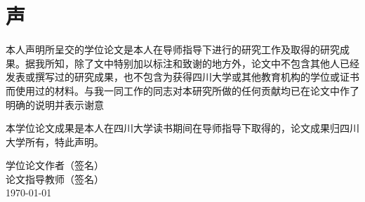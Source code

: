 
\chapter*{声}


本人声明所呈交的学位论文是本人在导师指导下进行的研究工作及取得的研究成果。据我所知，除了文中特别加以标注和致谢的地方外，论文中不包含其他人已经发表或撰写过的研究成果，也不包含为获得四川大学或其他教育机构的学位或证书而使用过的材料。与我一同工作的同志对本研究所做的任何贡献均已在论文中作了明确的说明并表示谢意

本学位论文成果是本人在四川大学读书期间在导师指导下取得的，论文成果归四川大学所有，特此声明。\par
\vspace{60pt}
\begin{flushright}
学位论文作者（签名）\CJKunderline{\hspace*{2in}}\\[24pt]
论文指导教师（签名）\CJKunderline{\hspace*{2in}}\\[24pt]
\today
\end{flushright}


